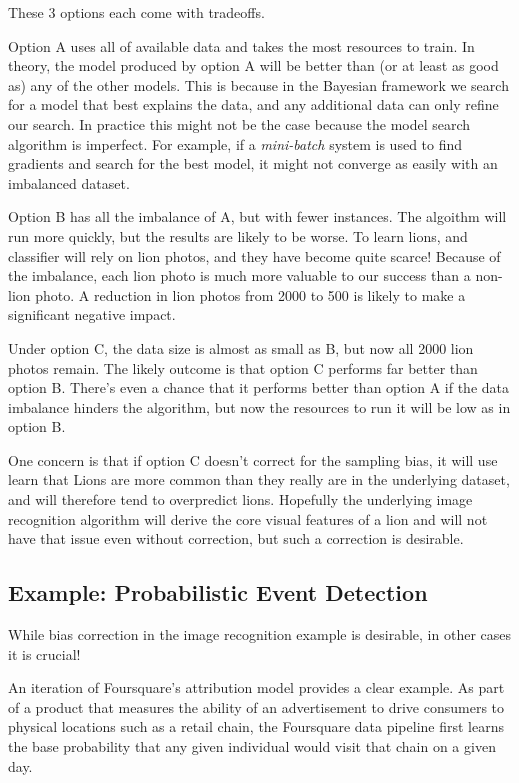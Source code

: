 \documentclass[twoside]{article}
\begin{document}
These 3 options each come with tradeoffs.

Option A uses all of available data and takes the most resources to train. In theory, the model produced by option A will be better than (or at least as good as) any of the other models. This is because in the Bayesian framework we search for a model that best explains the data, and any additional data can only refine our search. In practice this might not be the case because the model search algorithm is imperfect. For example, if a \textit{mini-batch} system is used to find gradients and search for the best model, it might not converge as easily with an imbalanced dataset.

Option B has all the imbalance of A, but with fewer instances. The algoithm will run more quickly, but the results are likely to be worse. To learn lions, and classifier will rely on lion photos, and they have become quite scarce! Because of the imbalance, each lion photo is much more valuable to our success than a non-lion photo. A reduction in lion photos from 2000 to 500 is likely to make a significant negative impact.

Under option C, the data size is almost as small as B, but now all 2000 lion photos remain. The likely outcome is that option C performs far better than option B. There's even a chance that it performs better than option A if the data imbalance hinders the algorithm, but now the resources to run it will be low as in option B.

One concern is that if option C doesn't correct for the sampling bias, it will use learn that Lions are more common than they really are in the underlying dataset, and will therefore tend to overpredict lions. Hopefully the underlying image recognition algorithm will derive the core visual features of a lion and will not have that issue even without correction, but such a correction is desirable.

\subsection{Example: Probabilistic Event Detection}
\label{section:visit}

While bias correction in the image recognition example is desirable, in other cases it is crucial!

An iteration of Foursquare’s attribution model\cite{visitprediction} provides a clear example. As part of a product that measures the ability of an advertisement to drive consumers to physical locations such as a retail chain, the Foursquare data pipeline first learns the base probability that any given individual would visit that chain on a given day.
\end{document}
